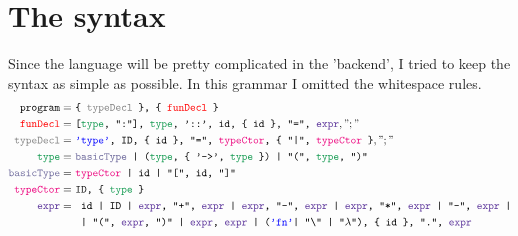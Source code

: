 \documentclass{article}
\begin{document}
	\section{The syntax}
	Since the language will be pretty complicated in the 'backend', I tried to keep the syntax as simple as possible. In this grammar I omitted the whitespace rules.
	\begin{align*}
	\texttt{program}  =\ & \texttt{\{ \color{gray}typeDecl \color{black} \}, \{ \color{red}funDecl \color{black} \}}\\
	\texttt{\color{red}funDecl\color{black}} =\ & \texttt{[\color{ForestGreen}type\color{black}, ":"], \color{ForestGreen}type\color{black}, '::', id, \{ id \}, "=", \color{RoyalPurple}expr\color{black}}, ";"\\
	\texttt{\color{gray}typeDecl\color{black}} =\ &\texttt{\color{blue}'type'\color{black}, ID, \{ id \}, "=", \color{RubineRed}typeCtor\color{black}, \{ "|", \color{RubineRed}typeCtor \color{black} \}}, ";"\\
	\texttt{\color{ForestGreen}type\color{black}} =\ &\texttt{\color{CadetBlue}basicType \color{black} | (\color{ForestGreen}type\color{black}, \{ '->', \color{ForestGreen}type \color{black} \}) | "(", \color{ForestGreen}type\color{black}, ")"}\\
	\texttt{\color{CadetBlue}basicType} =\ &	\texttt{\color{RubineRed}typeCtor \color{black}| id | "[", id, "]"}\\
	\texttt{\color{RubineRed}typeCtor\color{black}} =\ & \texttt{ID, \{ \color{ForestGreen}type \color{black} \}}\\
	\texttt{\color{RoyalPurple}expr\color{black}} =\ &  \texttt{
		id
		| ID
		| \color{RoyalPurple}expr\color{black}, "+", \color{RoyalPurple}expr \color{black} 
		| \color{RoyalPurple}expr\color{black}, "-", \color{RoyalPurple}expr \color{black} 
		| \color{RoyalPurple}expr\color{black}, "*", \color{RoyalPurple}expr \color{black}
		| "-", \color{RoyalPurple}expr \color{black}
		|}\\
	&\texttt{
		| "(", \color{RoyalPurple}expr\color{black}, ")" 
		| \color{RoyalPurple}expr\color{black}, \color{RoyalPurple}expr \color{black} 
		| (\color{blue}'fn'\color{black} | "\char`\\" | "$\lambda$"), \{ id \}, ".", \color{RoyalPurple}expr \color{black}
}
\end{align*}
\end{document}

